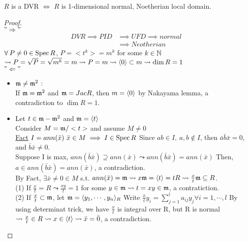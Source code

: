 \begin{prop} \label{dvr-equiv-condition}
  $R$ is a DVR $\iff$ $R$ is 1-dimensional normal, Noetherian local domain.
  \begin{proof} $ $ \\
    $"\Rightarrow"$ \\
    $$
      \begin{aligned}
        DVR \implies PID &\implies UFD \implies normal \\
        &\implies Neotherian
      \end{aligned}
    $$
    $\forall P \neq 0 \in \Spec R$, $P = <t^k> = m^k$ for some $k \in \mathbb{N}$
    $\leadsto P = \sqrt{P} = \sqrt{m^k} = m \leadsto P = m \leadsto
    \langle0\rangle \subset m \leadsto \dim R = 1$ \\
    $"\Leftarrow"$
    \begin{itemize}
      \item $\mathfrak{m} \ne \mathfrak{m}^2$ : \\
        If $\mathfrak{m} = \mathfrak{m}^2$ and $\mathfrak{m} = Jac R$, then $m = \langle0\rangle$ by Nakayama lemma,
        a contradiction to $\dim R = 1$.
      \item Let $t \in \mathfrak{m} - \mathfrak{m}^2$ and $\mathfrak{m} = \langle t\rangle$ \\
        Consider $M = \mathfrak{m} / <t>$ and assume $M \neq 0$ \\
        \underline{Fact} $I = ann(\bar{x})\ \bar{x} \in M \implies I \in \operatorname{Spec} R$
        Since $ab \in I,\ a,b \notin I$, then $\bar{a}\bar{b}\bar{x} = 0$, 
        and $\bar{b}\bar{x} \neq 0$. \\
        Suppose I is max, $ann(\bar{b}\bar{x}) \supseteq ann(\bar{x})
        \leadsto ann(\bar{b}\bar{x}) = ann(\bar{x})$ Then, $a \in ann(\bar{b}\bar{x})
        = ann(\bar{x})$, a contradiction. \\
        By Fact, $\exists \bar{x} \neq 0 \in M$ s.t. $ann(\bar{x}) = \mathfrak{m} \leadsto
        x\mathfrak{m} = \langle t\rangle = tR \leadsto \frac{x}{t}\mathfrak{m} \subseteq R$. \\
        (1) If $\frac{x}{t} = R \leadsto \frac{xy}{t} = 1$ for some $y \in \mathfrak{m}
        \leadsto t = xy \in \mathfrak{m}$, a contratiction. \\
        (2) If $\frac{x}{t} \subset \mathfrak{m}$, let $\mathfrak{m} = \langle y_1,\cdots, y_n\rangle_R$ Write
        $\frac{x}{t} y_i = \sum\limits_{j = 1}^{l} a_{ij}y_j \forall i = 1, \cdots,
        l$ By using determinat trick, we have $\frac{x}{t}$ is integral over R, but 
        R is normal $\leadsto \frac{x}{t} \in R \leadsto x \in \langle t\rangle \leadsto 
        \bar{x} = \bar{0}$, a contradiction. \\

\end{itemize}
\end{proof}
\end{prop}
